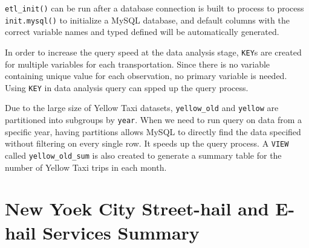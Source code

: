 \documentclass[12pt,twoside]{reedthesis}
\newenvironment{Shaded}{\begin{snugshade}}{\end{snugshade}}
\newcommand{\KeywordTok}[1]{\textcolor[rgb]{0.13,0.29,0.53}{\textbf{#1}}}
\newcommand{\DataTypeTok}[1]{\textcolor[rgb]{0.13,0.29,0.53}{#1}}
\newcommand{\StringTok}[1]{\textcolor[rgb]{0.31,0.60,0.02}{#1}}
\newcommand{\OperatorTok}[1]{\textcolor[rgb]{0.81,0.36,0.00}{\textbf{#1}}}
\newcommand{\NormalTok}[1]{#1}
\theoremstyle{definition}
\theoremstyle{definition}
\theoremstyle{definition}
\theoremstyle{remark}
\begin{document}
\texttt{etl\_init()} can be run after a database connection is built to
process to process \texttt{init.mysql()} to initialize a MySQL database,
and default columns with the correct variable names and typed defined
will be automatically generated.
\begin{Shaded}
\end{Shaded}
In order to increase the query speed at the data analysis stage,
\texttt{KEY}s are created for multiple variables for each
transportation. Since there is no variable containing unique value for
each observation, no primary variable is needed. Using \texttt{KEY} in
data analysis query can spped up the query process.

Due to the large size of Yellow Taxi datasets, \texttt{yellow\_old} and
\texttt{yellow} are partitioned into subgroups by \texttt{year}. When we
need to run query on data from a specific year, having partitions allows
MySQL to directly find the data specified without filtering on every
single row. It speeds up the query process. A \texttt{VIEW} called
\texttt{yellow\_old\_sum} is also created to generate a summary table
for the number of Yellow Taxi trips in each month.

\section{New Yoek City Street-hail and E-hail Services
Summary}\label{new-yoek-city-street-hail-and-e-hail-services-summary}
\end{document}
